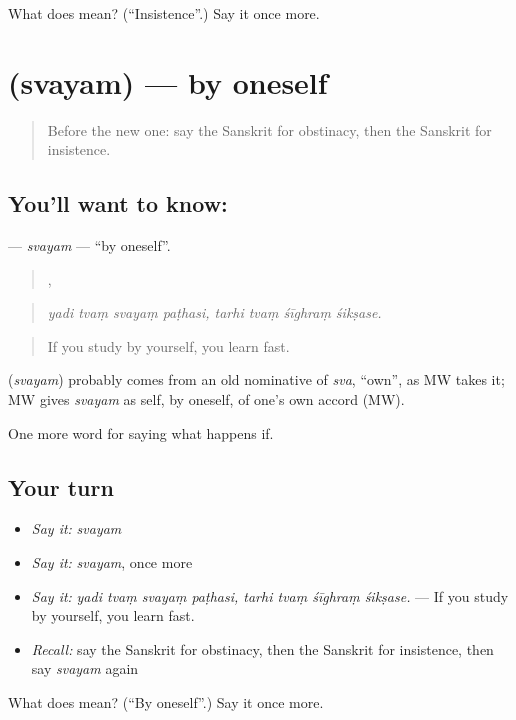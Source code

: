 \begin{tcolorbox}[breakable,colback=teal!4,colframe=teal!35!black,title={Before you move on}]
What does  mean? (\textquotedblleft{}Insistence\textquotedblright{}.) Say it once more.
\end{tcolorbox}
\section[\texorpdfstring{\sk{स्वयम्} (svayam)}{स्वयम् (svayam)}]{ (svayam) — by oneself}

\label{lesson:SA-C543-svayam}



\begin{quote}
Before the new one: say the Sanskrit for obstinacy, then the Sanskrit for insistence.
\end{quote}

\subsection*{You'll want to know: }
\textbf{} — \emph{svayam} — \textquotedblleft{}by oneself\textquotedblright{}.

\begin{quote}
   ,    
\end{quote}

\begin{quote}
\emph{yadi tvaṃ svayaṃ paṭhasi, tarhi tvaṃ śīghraṃ śikṣase.}
\end{quote}

\begin{quote}
If you study by yourself, you learn fast.
\end{quote}

\begin{cousinweb}
\textbf{} (\emph{svayam}) probably comes from an old nominative of \emph{sva}, \textquotedblleft{}own\textquotedblright{}, as MW takes it; MW gives \emph{svayam} as self, by oneself, of one's own accord (MW).
\end{cousinweb}

\begin{grammarlens}[title={What you've built}]
One more word for saying what happens if.
\end{grammarlens}

\subsection*{Your turn}
\begin{itemize}
\raggedright
  \item \emph{Say it:} \emph{svayam}
  \item \emph{Say it:} \emph{svayam}, once more
  \item \emph{Say it:} \emph{yadi tvaṃ svayaṃ paṭhasi, tarhi tvaṃ śīghraṃ śikṣase.} — If you study by yourself, you learn fast.
  \item \emph{Recall:} say the Sanskrit for obstinacy, then the Sanskrit for insistence, then say \emph{svayam} again
\end{itemize}

\begin{tcolorbox}[breakable,colback=teal!4,colframe=teal!35!black,title={Before you move on}]
What does  mean? (\textquotedblleft{}By oneself\textquotedblright{}.) Say it once more.
\end{tcolorbox}
